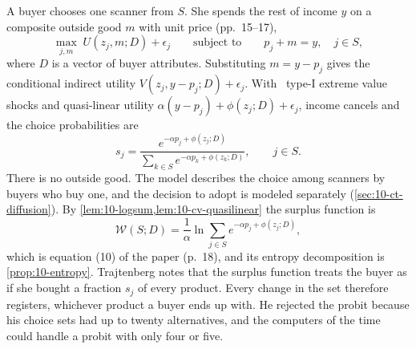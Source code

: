  A buyer chooses one scanner from $S$. She spends the rest of income
$y$ on a composite outside good $m$ with unit price (pp.~15--17),
\begin{equation}\label{eq:10-traj-rum}
\max_{j,m}\; U(z_j,m;D) + \epsilon_j
\qquad\text{subject to}\qquad p_j + m = y,\quad j\in S,
\end{equation}
where $D$ is a vector of buyer attributes. Substituting $m = y - p_j$ gives the conditional indirect utility
$V(z_j,y - p_j;D) + \epsilon_j$. With \iid\ type-I extreme value shocks and quasi-linear utility $\alpha(y - p_j) +
\phi(z_j;D) + \epsilon_j$, income cancels and the choice probabilities are
\begin{equation}\label{eq:10-traj-mnl}
s_j = \frac{e^{-\alpha p_j + \phi(z_j;D)}}{\sum_{k\in S}e^{-\alpha p_k + \phi(z_k;D)}},
\qquad j\in S .
\end{equation}
There is no outside good. The model describes the choice among scanners by buyers who buy one, and the decision
to adopt is modeled separately (\cref{sec:10-ct-diffusion}). By \cref{lem:10-logsum,lem:10-cv-quasilinear} the
surplus function is
\begin{equation}\label{eq:10-traj-W}
\mathcal{W}(S;D) = \frac{1}{\alpha}\ln\sum_{j\in S}e^{-\alpha p_j + \phi(z_j;D)},
\end{equation}
which is equation (10) of the paper (p.~18), and its entropy decomposition is \cref{prop:10-entropy}. Trajtenberg
notes that the surplus function treats the buyer as if she bought a fraction $s_j$ of every product. Every change in
the set therefore registers, whichever product a buyer ends up with. He rejected the probit because his choice sets
had up to twenty alternatives, and the computers of the time could handle a probit with only four or five.

